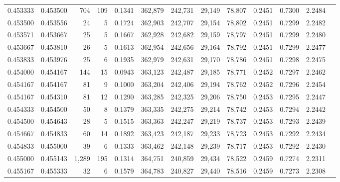 \begin{tabular}{rrrrrrrrrrrrr}
0.453333 & 0.453500 &   704 & 109 &                                     0.1341 & 362,879 & 242,731 &  29,149 &  78,807 & 0.2451 & 0.7300 & 2.2484 \\
0.453500 & 0.453556 &    24 &   5 &                                     0.1724 & 362,903 & 242,707 &  29,154 &  78,802 & 0.2451 & 0.7299 & 2.2482 \\
0.453571 & 0.453667 &    25 &   5 &                                     0.1667 & 362,928 & 242,682 &  29,159 &  78,797 & 0.2451 & 0.7299 & 2.2480 \\
0.453667 & 0.453810 &    26 &   5 &                                     0.1613 & 362,954 & 242,656 &  29,164 &  78,792 & 0.2451 & 0.7299 & 2.2477 \\
0.453833 & 0.453976 &    25 &   6 &                                     0.1935 & 362,979 & 242,631 &  29,170 &  78,786 & 0.2451 & 0.7298 & 2.2475 \\
0.454000 & 0.454167 &   144 &  15 &                                     0.0943 & 363,123 & 242,487 &  29,185 &  78,771 & 0.2452 & 0.7297 & 2.2462 \\
0.454167 & 0.454167 &    81 &   9 &                                     0.1000 & 363,204 & 242,406 &  29,194 &  78,762 & 0.2452 & 0.7296 & 2.2454 \\
0.454167 & 0.454310 &    81 &  12 &                                     0.1290 & 363,285 & 242,325 &  29,206 &  78,750 & 0.2453 & 0.7295 & 2.2447 \\
0.454333 & 0.454500 &    50 &   8 &                                     0.1379 & 363,335 & 242,275 &  29,214 &  78,742 & 0.2453 & 0.7294 & 2.2442 \\
0.454500 & 0.454643 &    28 &   5 &                                     0.1515 & 363,363 & 242,247 &  29,219 &  78,737 & 0.2453 & 0.7293 & 2.2439 \\
0.454667 & 0.454833 &    60 &  14 &                                     0.1892 & 363,423 & 242,187 &  29,233 &  78,723 & 0.2453 & 0.7292 & 2.2434 \\
0.454833 & 0.455000 &    39 &   6 &                                     0.1333 & 363,462 & 242,148 &  29,239 &  78,717 & 0.2453 & 0.7292 & 2.2430 \\
0.455000 & 0.455143 & 1,289 & 195 &                                     0.1314 & 364,751 & 240,859 &  29,434 &  78,522 & 0.2459 & 0.7274 & 2.2311 \\
0.455167 & 0.455333 &    32 &   6 &                                     0.1579 & 364,783 & 240,827 &  29,440 &  78,516 & 0.2459 & 0.7273 & 2.2308 \\

\end{tabular}
